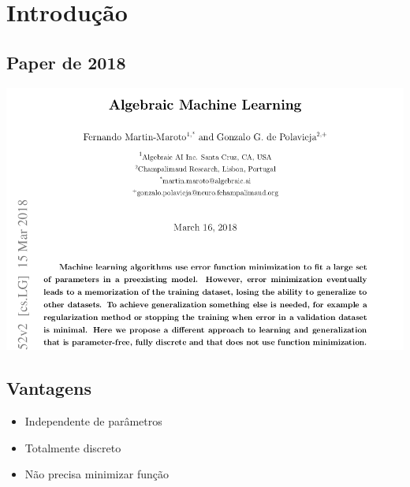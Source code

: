 \section{Introdução}
\subsection*{Paper de 2018}
\begin{frame}{\subsecname}
    \centering
    \includegraphics[width=\textwidth]{fig/paper.png}
\end{frame}
\subsection*{Vantagens}
\begin{frame}{\subsecname}
    \begin{itemize}
        \item<1-> Independente de parâmetros
        \item<2-> Totalmente discreto
        \item<3-> Não precisa minimizar função
    \end{itemize}
\end{frame}
